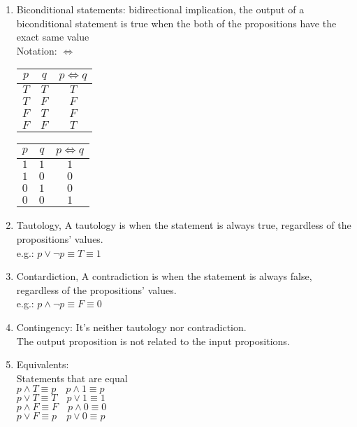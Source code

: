 \documentclass{article}
\begin{document}
\begin{enumerate}[label=Def. \arabic*:, leftmargin=3.5em, align=left]
\begin{tabular}{cc|c}
  \end{tabular}
  \item Biconditional statements: bidirectional implication, the output of a biconditional statement is true when the both of the propositions have the exact same value\\
  Notation: $\Leftrightarrow$
  \vspace{.25cm}\\
  \begin{tabular}{cc|c}
    $p$ & $q$ & $p \Leftrightarrow q$ \\ \hline 
    $T$ & $T$ & $T$ \\
    $T$ & $F$ & $F$ \\
    $F$ & $T$ & $F$ \\
    $F$ & $F$ & $T$ \\
  \end{tabular} \qquad
  \begin{tabular}{cc|c}
    $p$ & $q$ & $p \Leftrightarrow q$ \\ \hline 
    $1$ & $1$ & $1$ \\
    $1$ & $0$ & $0$ \\
    $0$ & $1$ & $0$ \\
    $0$ & $0$ & $1$ \\
  \end{tabular}
  \newpage
  \item Tautology, A tautology is when the statement is always true, regardless of the propositions' values.\\
  e.g.: $p \vee \neg p \equiv T \equiv 1$
  \item Contardiction, A contradiction is when the statement is always false, regardless of the propositions' values.\\
  e.g.: $p \wedge \neg p \equiv F \equiv 0$
  \item Contingency:
  It's neither tautology nor contradiction.\\The output proposition is not related to the input propositions.
  \item Equivalents:\\
  Statements that are equal\\
  $p \wedge T \equiv p \quad p \wedge 1 \equiv p$\\
  $p \vee T \equiv T \quad p \vee 1 \equiv 1$\\
  $p \wedge F \equiv F \quad p \wedge 0 \equiv 0$\\
  $p \vee F \equiv p \quad p \vee 0 \equiv p$
    
\end{enumerate}
\end{document}

